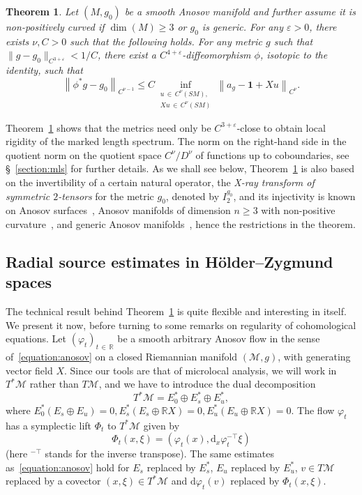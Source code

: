 \documentclass[10pt]{amsart}
\newtheorem{theo}{Theorem}[section]
\theoremstyle{definition}\newtheorem{defi}[theo]{Definition}\newtheorem{rema}[theo]{Remark}\newtheorem{exam}[theo]{Example}\newtheorem{exem}[theo]{Example}\newtheorem{nota}[theo]{Notation}
\newcommand{\R}{\mathbb{R}}
\newcommand{\bfun}{\mathbf{1}}
\newcommand{\eps}{\varepsilon}
\newcommand{\M}{\mathcal{M}}
\newcommand{\dd}{\mathrm{d}}
\begin{document}
\begin{theo}\label{theorem:mls}
Let $(M,g_0)$ be a smooth Anosov manifold and further assume it is non-positively curved if $\dim(M) \geq 3$ or $g_0$ is generic. For any $\eps>0$, there exists $\nu, C > 0$ such that the following holds. For any metric $g$ such that $\|g-g_0\|_{C^{3+\eps}} < 1/C$, there exist a $C^{4+\eps}$-diffeomorphism $\phi$, isotopic to the identity, such that
\[
\left\| \phi^* g - g_0 \right\|_{C^{\nu-1}} \leq C \inf_{\substack{u\,\in\,C^\nu(SM), \\ Xu\,\in\,C^\nu(SM)}} \left\|a_g-\bfun + Xu\right\|_{C^{\nu}}.
\]
\end{theo}

Theorem~\ref{theorem:mls} shows that the metrics need only be $C^{3+\eps}$-close to obtain local rigidity of the marked length spectrum. The norm on the right-hand side in the quotient norm on the quotient space $C^\nu/D^{\nu}$ of functions up to coboundaries, see \S~\ref{section:mls} for further details. As we shall see below, Theorem~\ref{theorem:mls} is also based on the invertibility of a certain natural operator, the \emph{X-ray transform of symmetric $2$-tensors} for the metric $g_0$, denoted by $I_2^{g_0}$, and its injectivity is known on Anosov surfaces~\cite{Paternain-Salo-Uhlmann-14-1, Guillarmou-17-1}, Anosov manifolds of dimension $n \geq 3$ with non-positive curvature~\cite{Croke-Sharafutdinov-98}, and generic Anosov manifolds~\cite{Cekic-Lefeuvre-21}, hence the restrictions in the theorem.



\subsection{Radial source estimates in H\"older--Zygmund spaces}

The technical result behind Theorem~\ref{theorem:mls} is quite flexible and interesting in itself. We present it now, before turning to some remarks on regularity of cohomological equations. Let $(\varphi_t)_{t\,\in\,\R}$ be a smooth arbitrary Anosov flow in the sense of~\eqref{equation:anosov} on a closed Riemannian manifold $(\M,g)$, with generating vector field $X$. Since our tools are that of microlocal analysis, we will work in $T^\ast\M$ rather than $T\M$, and we have to introduce the dual decomposition
\[
T^*\M = E_0^* \oplus E_s^* \oplus E_u^*,
\]
where $E_0^*(E_s\oplus E_u)=0, E_s^*(E_s\oplus \R X) = 0, E_u^*(E_u \oplus \R X)=0$. The flow $\varphi_t$ has a symplectic lift $\Phi_t$ to $T^\ast \M$ given by
\[
\Phi_t(x,\xi) = \left(\varphi_t(x), \dd_x\varphi_t^{-\top} \xi\right)
\]
(here ${}^{-\top}$ stands for the inverse transpose). The same estimates as~\eqref{equation:anosov} hold for $E_s$ replaced by $E_s^*$, $E_u$ replaced by $E_u^*$, $v \in T\M$ replaced by a covector $(x,\xi) \in T^*\M$ and $\dd \varphi_t(v) $ replaced by $\Phi_t(x,\xi)$.
\end{document}
